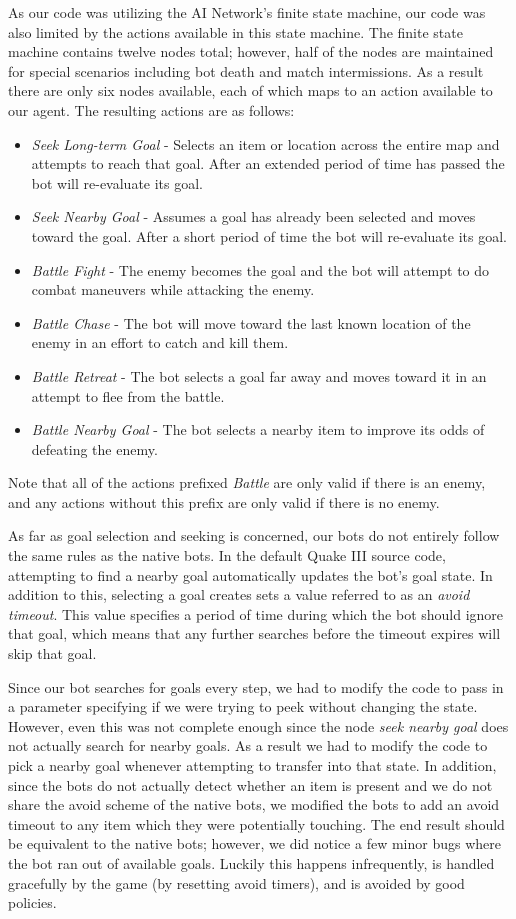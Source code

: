 As our code was utilizing the AI Network's finite state machine, our code was also limited by the actions available in this state machine. The finite state machine contains twelve nodes total; however, half of the nodes are maintained for special scenarios including bot death and match intermissions. As a result there are only six nodes available, each of which maps to an action available to our agent. The resulting actions are as follows:

\begin{itemize}
    \item \emph{Seek Long-term Goal} - Selects an item or location across the entire map and attempts to reach that goal. After an extended period of time has passed the bot will re-evaluate its goal.
    \item \emph{Seek Nearby Goal} - Assumes a goal has already been selected and moves toward the goal. After a short period of time the bot will re-evaluate its goal.
    \item \emph{Battle Fight} - The enemy becomes the goal and the bot will attempt to do combat maneuvers while attacking the enemy.
    \item \emph{Battle Chase} - The bot will move toward the last known location of the enemy in an effort to catch and kill them.
    \item \emph{Battle Retreat} - The bot selects a goal far away and moves toward it in an attempt to flee from the battle.
    \item \emph{Battle Nearby Goal} - The bot selects a nearby item to improve its odds of defeating the enemy.
\end{itemize}
Note that all of the actions prefixed \emph{Battle} are only valid if there is an enemy, and any actions without this prefix are only valid if there is no enemy.

As far as goal selection and seeking is concerned, our bots do not entirely follow the same rules as the native bots. In the default Quake III source code, attempting to find a nearby goal automatically updates the bot's goal state. In addition to this, selecting a goal creates sets a value referred to as an \emph{avoid timeout}. This value specifies a period of time during which the bot should ignore that goal, which means that any further searches before the timeout expires will skip that goal. 

Since our bot searches for goals every step, we had to modify the code to pass in a parameter specifying if we were trying to peek without changing the state. However, even this was not complete enough since the node \emph{seek nearby goal} does not actually search for nearby goals. As a result we had to modify the code to pick a nearby goal whenever attempting to transfer into that state. In addition, since the bots do not actually detect whether an item is present and we do not share the avoid scheme of the native bots, we modified the bots to add an avoid timeout to any item which they were potentially touching. The end result should be equivalent to the native bots; however, we did notice a few minor bugs where the bot ran out of available goals. Luckily this happens infrequently, is handled gracefully by the game (by resetting avoid timers), and is avoided by good policies.


